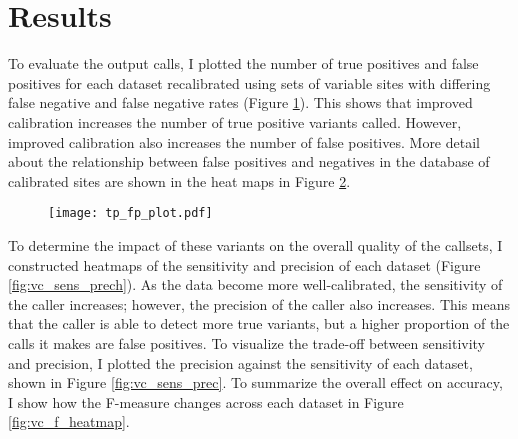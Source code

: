 \section{Results}

To evaluate the output calls, I plotted the number of true positives and false positives for each dataset recalibrated using sets of variable sites with differing false negative and false negative rates (Figure \ref{fig:vc_fptp}). This shows that improved calibration increases the number of true positive variants called. However, improved calibration also increases the number of false positives. More detail about the relationship between false positives and negatives in the database of calibrated sites are shown in the heat maps in Figure \ref{fig:vc_p}.


\begin{figure}
\centering
\texttt{[image: tp\_fp\_plot.pdf]}
\label{fig:vc_fptp}
\end{figure}

\begin{figure}
\centering
{}
\label{fig:vc_p}
\end{figure}

To determine the impact of these variants on the overall quality of the callsets, I constructed heatmaps of the sensitivity and precision of each dataset (Figure \ref{fig:vc_sens_prech}). As the data become more well-calibrated, the sensitivity of the caller increases; however, the precision of the caller also increases. This means that the caller is able to detect more true variants, but a higher proportion of the calls it makes are false positives. To visualize the trade-off between sensitivity and precision, I plotted the precision against the sensitivity of each dataset, shown in Figure \ref{fig:vc_sens_prec}. To summarize the overall effect on accuracy, I show how the F-measure changes across each dataset in Figure \ref{fig:vc_f_heatmap}.


